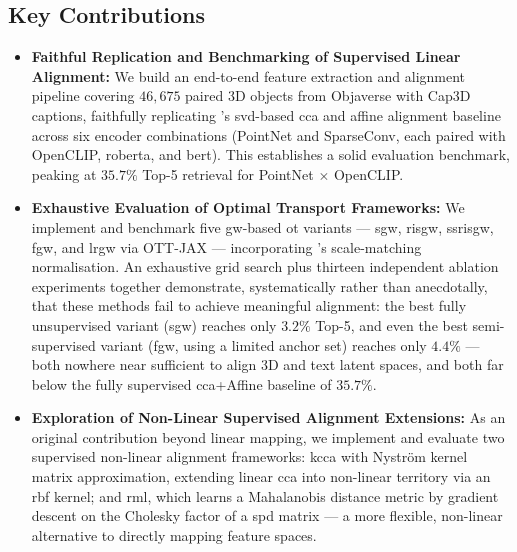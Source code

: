 \subsection{Key Contributions}

\label{subsec:contributions}

\begin{itemize}

\item \textbf{Faithful Replication and Benchmarking of Supervised Linear Alignment:} We build an end-to-end feature extraction and alignment pipeline covering $46{,}675$ paired 3D objects from Objaverse with Cap3D captions, faithfully replicating \textcite{hadgi2025escaping}'s \gls{svd}-based \gls{cca} and affine alignment baseline across six encoder combinations (PointNet and SparseConv, each paired with OpenCLIP, \gls{roberta}, and \gls{bert}). This establishes a solid evaluation benchmark, peaking at $35.7\%$ Top-5 retrieval for PointNet $\times$ OpenCLIP.

\item \textbf{Exhaustive Evaluation of Optimal Transport Frameworks:} We implement and benchmark five \gls{gw}-based \gls{ot} variants --- \gls{sgw}, \gls{risgw}, \gls{ssrisgw}, \gls{fgw}, and \gls{lrgw} via OTT-JAX --- incorporating \textcite{li2026scale}'s scale-matching normalisation. An exhaustive grid search plus thirteen independent ablation experiments together demonstrate, systematically rather than anecdotally, that these methods fail to achieve meaningful alignment: the best fully unsupervised variant (\gls{sgw}) reaches only $3.2\%$ Top-5, and even the best semi-supervised variant (\gls{fgw}, using a limited anchor set) reaches only $4.4\%$ --- both nowhere near sufficient to align 3D and text latent spaces, and both far below the fully supervised \gls{cca}+Affine baseline of $35.7\%$.

\item \textbf{Exploration of Non-Linear Supervised Alignment Extensions:}
As an original contribution beyond linear mapping, we implement and evaluate
two supervised non-linear alignment frameworks: \gls{kcca} with
Nystr\"{o}m kernel matrix approximation, extending linear \gls{cca} into
non-linear territory via an \gls{rbf} kernel; and \gls{rml}, which learns a
Mahalanobis distance metric by gradient descent on the Cholesky factor of a
\gls{spd} matrix --- a more flexible, non-linear alternative to directly mapping
feature spaces.


\end{itemize}
